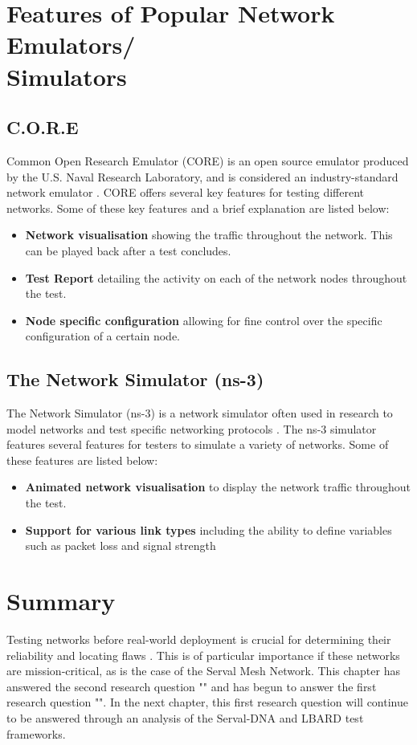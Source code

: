 \section{Features of Popular Network Emulators/\\Simulators}
\subsection{C.O.R.E}
Common Open Research Emulator (CORE) is an open source emulator produced by the U.S. Naval Research Laboratory, and is considered an industry-standard network emulator \parencite{coreDocumentation}.
CORE offers several key features for testing different networks. Some of these key features and a brief explanation are listed below:
\begin{itemize}
    \item \textbf{Network visualisation} showing the traffic throughout the network. This can be played back after a test concludes.
    \item \textbf{Test Report} detailing the activity on each of the network nodes throughout the test.
    \item \textbf{Node specific configuration} allowing for fine control over the specific configuration of a certain node.
\end{itemize}

\subsection{The Network Simulator (ns-3)}
The Network Simulator (ns-3) is a network simulator often used in research to model networks and test specific networking protocols \parencite{modellingAndTools2010}.
The ns-3 simulator features several features for testers to simulate a variety of networks. Some of these features are listed below:
\begin{itemize}
    \item \textbf{Animated network visualisation} to display the network traffic throughout the test.
    \item \textbf{Support for various link types} including the ability to define variables such as packet loss and signal strength
\end{itemize}


\section{Summary}
Testing networks before real-world deployment is crucial for determining their reliability and locating flaws \parencite{predeploymentTesting2006}.
This is of particular importance if these networks are mission-critical, as is the case of the Serval Mesh Network.
This chapter has answered the second research question "\secondRQ" and has begun to answer the first research question "\firstRQ".
In the next chapter, this first research question will continue to be answered through an analysis of the Serval-DNA and LBARD test frameworks.
